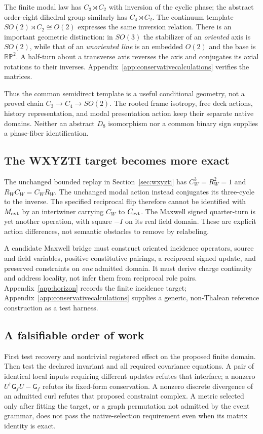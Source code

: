 The finite modal law has $C_3\rtimes C_2$ with inversion of the cyclic phase; the abstract order-eight dihedral group similarly has $C_4\rtimes C_2$. The continuum template $SO(2)\rtimes C_2\cong O(2)$ expresses the same inversion relation. There is an important geometric distinction: in $SO(3)$ the stabilizer of an \emph{oriented} axis is $SO(2)$, while that of an \emph{unoriented line} is an embedded $O(2)$ and the base is $\mathbb{RP}^2$. A half-turn about a transverse axis reverses the axis and conjugates its axial rotations to their inverses. Appendix~\ref{app:conservativecalculations} verifies the matrices.

Thus the common semidirect template is a useful conditional geometry, not a proved chain $C_3\to C_4\to SO(2)$. The rooted frame isotropy, free deck actions, history representation, and modal presentation action keep their separate native domains. Neither an abstract $D_8$ isomorphism nor a common binary sign supplies a phase-fiber identification.

\subsection{The WXYZTI target becomes more exact}
The unchanged bounded replay in Section~\ref{sec:wxyzti} has $C_W^3=R_W^2=1$ and $R_WC_W=C_WR_W$. The unchanged modal action instead conjugates its three-cycle to the inverse. The specified reciprocal flip therefore cannot be identified with $M_{\mathrm{evt}}$ by an intertwiner carrying $C_W$ to $C_{\mathrm{evt}}$. The Maxwell signed quarter-turn is yet another operation, with square $-I$ on its real field domain. These are explicit action differences, not semantic obstacles to remove by relabeling.

A candidate Maxwell bridge must construct oriented incidence operators, source and field variables, positive constitutive pairings, a reciprocal signed update, and preserved constraints on \emph{one} admitted domain. It must derive charge continuity and address locality, not infer them from reciprocal role pairs. Appendix~\ref{app:horizon} records the finite incidence target; Appendix~\ref{app:conservativecalculations} supplies a generic, non-Thalean reference construction as a test harness.

\subsection{A falsifiable order of work}
First test recovery and nontrivial registered effect on the proposed finite domain. Then test the declared invariant and all required covariance equations. A pair of identical local inputs requiring different updates refutes that interface; a nonzero $U^\dagger\mathsf G_fU-\mathsf G_f$ refutes its fixed-form conservation. A nonzero discrete divergence of an admitted curl refutes that proposed constraint complex. A metric selected only after fitting the target, or a graph permutation not admitted by the event grammar, does not pass the native-selection requirement even when its matrix identity is exact.

